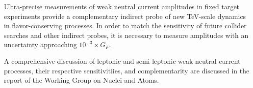 
Ultra-precise measurements of weak neutral current amplitudes in fixed target experiments provide a complementary indirect probe of new TeV-scale dynamics in flavor-conserving processes.
In order to match the sensitivity of future collider
searches and other indirect probes, it is necessary to measure amplitudes with an uncertainty
approaching $10^{-3}\times G_F$. 

A comprehensive discussion of leptonic and semi-leptonic weak neutral current processes, their respective 
sensitivitiies, and complementarity are discussed in the report of the Working Group on Nuclei and Atoms. 

